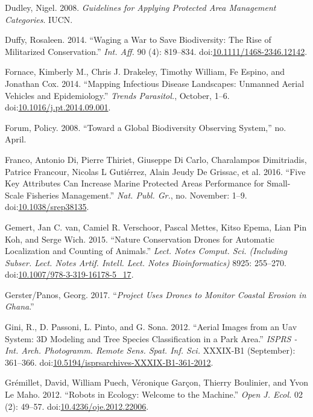 \documentclass[]{interact}
\theoremstyle{plain}%
\theoremstyle{definition}
\theoremstyle{remark}
\begin{document}
\hypertarget{ref-dudley_guidelines_2008}{}
Dudley, Nigel. 2008. \emph{Guidelines for Applying Protected Area
Management Categories}. IUCN.

\hypertarget{ref-duffy_waging_2014}{}
Duffy, Rosaleen. 2014. ``Waging a War to Save Biodiversity: The Rise of
Militarized Conservation.'' \emph{Int. Aff.} 90 (4): 819--834.
doi:\href{https://doi.org/10.1111/1468-2346.12142}{10.1111/1468-2346.12142}.

\hypertarget{ref-fornace_mapping_2014}{}
Fornace, Kimberly M., Chris J. Drakeley, Timothy William, Fe Espino, and
Jonathan Cox. 2014. ``Mapping Infectious Disease Landscapes: Unmanned
Aerial Vehicles and Epidemiology.'' \emph{Trends Parasitol.}, October,
1--6.
doi:\href{https://doi.org/10.1016/j.pt.2014.09.001}{10.1016/j.pt.2014.09.001}.

\hypertarget{ref-forum_toward_2008}{}
Forum, Policy. 2008. ``Toward a Global Biodiversity Observing System,''
no. April.

\hypertarget{ref-franco_five_2016}{}
Franco, Antonio Di, Pierre Thiriet, Giuseppe Di Carlo, Charalampos
Dimitriadis, Patrice Francour, Nicolas L Gutiérrez, Alain Jeudy De
Grissac, et al. 2016. ``Five Key Attributes Can Increase Marine
Protected Areas Performance for Small-Scale Fisheries Management.''
\emph{Nat. Publ. Gr.}, no. November: 1--9.
doi:\href{https://doi.org/10.1038/srep38135}{10.1038/srep38135}.

\hypertarget{ref-van_gemert_nature_2015}{}
Gemert, Jan C. van, Camiel R. Verschoor, Pascal Mettes, Kitso Epema,
Lian Pin Koh, and Serge Wich. 2015. ``Nature Conservation Drones for
Automatic Localization and Counting of Animals.'' \emph{Lect. Notes
Comput. Sci. (Including Subser. Lect. Notes Artif. Intell. Lect. Notes
Bioinformatics)} 8925: 255--270.
doi:\href{https://doi.org/10.1007/978-3-319-16178-5_17}{10.1007/978-3-319-16178-5\_17}.

\hypertarget{ref-Georg2016}{}
Gerster/Panos, Georg. 2017. ``\emph{Project Uses Drones to Monitor
Coastal Erosion in Ghana}.''

\hypertarget{ref-gini_aerial_2012}{}
Gini, R., D. Passoni, L. Pinto, and G. Sona. 2012. ``Aerial Images from
an Uav System: 3D Modeling and Tree Species Classification in a Park
Area.'' \emph{ISPRS - Int. Arch. Photogramm. Remote Sens. Spat. Inf.
Sci.} XXXIX-B1 (September): 361--366.
doi:\href{https://doi.org/10.5194/isprsarchives-XXXIX-B1-361-2012}{10.5194/isprsarchives-XXXIX-B1-361-2012}.

\hypertarget{ref-gremillet_robots_2012}{}
Grémillet, David, William Puech, Véronique Garçon, Thierry Boulinier,
and Yvon Le Maho. 2012. ``Robots in Ecology: Welcome to the Machine.''
\emph{Open J. Ecol.} 02 (2): 49--57.
doi:\href{https://doi.org/10.4236/oje.2012.22006}{10.4236/oje.2012.22006}.
\end{document}
